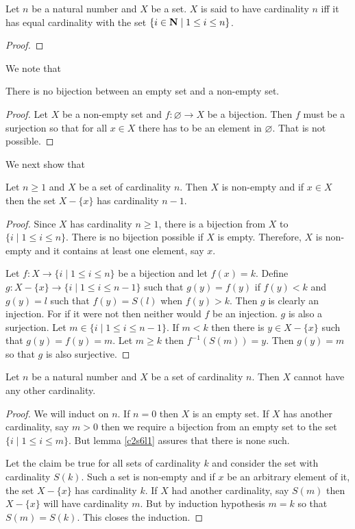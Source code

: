 \begin{defn}\label{c2s6d2}
Let $n$ be a natural number and $X$ be a set. $X$ is said to have cardinality 
$n$ iff it has equal cardinality with the set $\{i \in \mathbf{N} \;|\; 1 \le i \le
n\}$.
\end{defn}
\begin{proof}
\end{proof}

We note that
\begin{lem}\label{c2s6l1}
There is no bijection between an empty set and a non-empty set.
\end{lem}
\begin{proof}
Let $X$ be a non-empty set and $f:\varnothing \rightarrow X$ be a bijection.
Then $f$ must be a surjection so that for all $x \in X$ there has to be an
element in $\varnothing$. That is not possible.
\end{proof}

We next show that
\begin{lem}\label{c2s6l2}
Let $n \ge 1$ and $X$ be a set of cardinality $n$. Then $X$ is non-empty and if
$x \in X$ then the set $X - \{x\}$ has cardinality $n - 1$.
\end{lem}
\begin{proof}
Since $X$ has cardinality $n \ge 1$, there is a bijection from $X$ to $\{i\;|\;
1 \le i \le n\}$. There is no bijection possible if $X$ is empty. Therefore, $X$
is non-empty and it contains at least one element, say $x$.

Let $f: X \rightarrow \{i \;|\; 1 \le i \le n\}$ be a bijection and let $f(x) =
k$. Define $g: X - \{x\} \rightarrow \{i \;|\; 1 \le i \le n - 1\}$ such that
$g(y) = f(y)$ if $f(y) < k$ and $g(y) = l$ such that $f(y) = S(l)$ when $f(y)
> k$. Then $g$ is clearly an injection. For if it were not then neither would
$f$ be an injection. $g$ is also a surjection. Let $m \in \{i \;|\; 1 \le i 
\le n - 1\}$. If $m < k$ then there is $y \in X - \{x\}$ such that $g(y) = 
f(y) = m$. Let $m \ge k$ then $f^{-1}(S(m)) = y$. Then $g(y) = m$ so that $g$
is also surjective.
\end{proof}

\begin{prop}\label{c2s6p2}
Let $n$ be a natural number and $X$ be a set of cardinality $n$. Then $X$ cannot
have any other cardinality.
\end{prop}
\begin{proof}
We will induct on $n$. If $n = 0$ then $X$ is an empty set. If $X$ has another
cardinality, say $m > 0$ then we require a bijection from an empty set to the
set $\{i \;|\; 1 \le i \le m\}$. But lemma \ref{c2s6l1} assures that there is 
none such.

Let the claim be true for all sets of cardinality $k$ and consider the set with
cardinality $S(k)$. Such a set is non-empty and if $x$ be an arbitrary element
of it, the set $X - \{x\}$ has cardinality $k$. If $X$ had another cardinality,
say $S(m)$ then $X - \{x\}$ will have cardinality $m$. But by induction 
hypothesis $m = k$ so that $S(m) = S(k)$. This closes the induction.
\end{proof}

